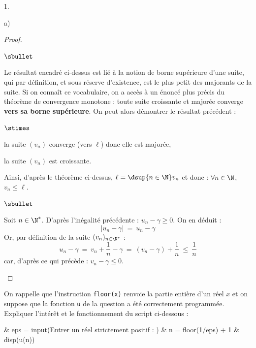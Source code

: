 \documentclass[11pt]{article}%
\begin{document}
\begin{noliste}{1.}
\begin{noliste}{a)}
\begin{proof}
\begin{remark}
\begin{noliste}{$\sbullet$}
          \item Le résultat encadré ci-dessus est lié à la notion de
            borne supérieure d'une suite, qui par définition, et sous
            réserve d'existence, est le plus petit des majorants de la
            suite. Si on connaît ce vocabulaire, on a accès à un
            énoncé plus précis du théorème de convergence monotone :
            toute suite croissante et majorée converge {\bf vers sa
              borne supérieure}. On peut alors démontrer le résultat
            précédent :
            \begin{noliste}{$\stimes$}
            \item la suite $(v_n)$ converge (vers $\ell$) donc elle
              est majorée,
            \item la suite $(v_n)$ est croissante.
            \end{noliste}
            Ainsi, d'après le théorème ci-dessus, $\ell = \dsup{n \in
              \N} v_n$ et donc : $\forall n \in \N$, $v_n \leq \ell$.
          \end{noliste}

        \end{remark}

        \begin{noliste}{$\sbullet$}
      \item Soit $n \in \N^*$. D'après l'inégalité précédente : $u_n -
        \gamma \geq 0$. On en déduit :
        \[
        \big| u_n - \gamma \big| \ = \ u_n - \gamma
        \]
        Or, par définition de la suite $(v_n)_{n \in \N^*}$ :
        \[
        u_n - \gamma \ = \ v_n + \dfrac{1}{n} - \gamma \ = \ \left(v_n
          - \gamma \right) + \dfrac{1}{n} \ \leq \ \dfrac{1}{n}
        \]
        car, d'après ce qui précède : $v_n - \gamma \leq 0$.%
        ~\\[-1.4cm]
      \end{noliste}
    \end{proof}

  \item On rappelle que l'instruction {\tt floor(x)} renvoie la partie
    entière d'un réel $x$ et on suppose que la fonction {\tt u} de la
    question \itbf{1.e)} a été correctement programmée. Expliquer
    l'intérêt et le fonctionnement du script ci-dessous :
    \begin{scilab}
      & eps = input(\ttq{}Entrer un réel strictement positif : \ttq{})
      \nl %
      & n = floor(1/eps) + 1 \nl %
      & disp(u(n))
    \end{scilab}


\end{noliste}
\end{noliste}
\end{document}
